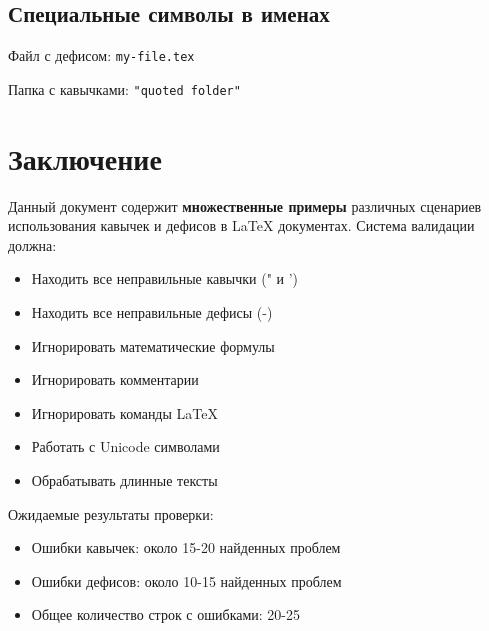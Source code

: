 \documentclass[12pt,a4paper]{article}
\begin{document}
\subsection{Специальные символы в именах}

Файл с дефисом: \texttt{my-file.tex}

Папка с кавычками: \texttt{"quoted folder"}

\section{Заключение}

Данный документ содержит \textbf{множественные примеры} различных сценариев использования кавычек и дефисов в LaTeX документах. Система валидации должна:

\begin{itemize}
    \item Находить все неправильные кавычки (" и ')
    \item Находить все неправильные дефисы (-)
    \item Игнорировать математические формулы
    \item Игнорировать комментарии
    \item Игнорировать команды LaTeX
    \item Работать с Unicode символами
    \item Обрабатывать длинные тексты
\end{itemize}

Ожидаемые результаты проверки:
\begin{itemize}
    \item Ошибки кавычек: около 15-20 найденных проблем
    \item Ошибки дефисов: около 10-15 найденных проблем
    \item Общее количество строк с ошибками: 20-25
\end{itemize}

\end{document}
